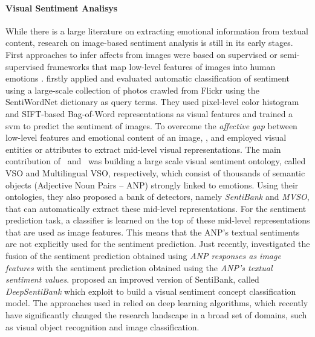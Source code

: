 
\paragraph{Visual Sentiment Analisys}
While there is a large literature on extracting emotional information from textual content, research on image-based sentiment analysis is still in its early stages.
First approaches to infer affects from images were based on supervised or semi-supervised frameworks that map low-level features of images into human emotions \cite{machajdik2010affective,siersdorfer2010analyzing,jia2012can}.
 \citet{siersdorfer2010analyzing} firstly applied and evaluated automatic classification of sentiment using a large-scale collection of photos crawled from Flickr using the SentiWordNet \cite{esuli2007sentiwordnet} dictionary as query terms. %
They used pixel-level color histogram and SIFT-based Bag-of-Word representations as visual features and trained a \gls{svm} to predict the sentiment of images. %
To overcome the \emph{affective gap} between low-level features and emotional content of an image, \citet{borth2013large}, \citet{yuan2013sentribute} and \citet{jou2015visual} employed visual entities or attributes to extract mid-level visual representations.
The main contribution of~\cite{borth2013large} and~\cite{jou2015visual} was building a large scale visual sentiment ontology, called VSO and Multilingual VSO, respectively, which consist of thousands of semantic objects (Adjective Noun Pairs -- ANP) strongly linked to emotions.
Using their ontologies, they also proposed  a bank of detectors, namely \emph{SentiBank} and \emph{MVSO}, that can automatically extract these mid-level representations.
For the sentiment prediction task, a classifier is learned on the top of these mid-level representations that are used as image features.
This means that the ANP's textual sentiments are not explicitly used for the sentiment prediction.
Just recently, \citet{li2018image} investigated the fusion of the sentiment prediction obtained using \emph{ANP responses as image features} with the sentiment prediction obtained using the \emph{ANP's textual sentiment values}.
\citet{chen2014deepsentibank} proposed an improved version of SentiBank, called \emph{DeepSentiBank} which exploit  to build a visual sentiment concept classification model.
The approaches used in \cite{jou2015visual,li2018image} relied on deep learning algorithms, which recently have significantly changed the research landscape in a broad set of domains, such as visual object recognition and image classification. %
